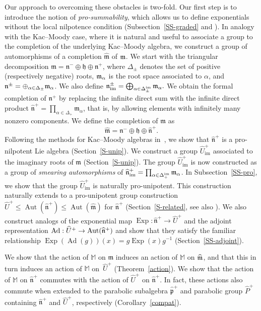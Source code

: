 \documentclass[11pt,letterpaper]{amsart}
\numberwithin{thecounter}{section}
\theoremstyle{definition}
\DeclareMathOperator{\Aut}{Aut}
\DeclareMathOperator{\Exp}{Exp}
\DeclareMathOperator{\Ad}{Ad}
\DeclareMathOperator{\im}{{im}}
\renewcommand{\a}{\alpha}
\newcommand{\M}{{\mathbb M}}
\newcommand{\Uhp}{{\widehat{U}^+}}
\newcommand{\Uhimp}{{\widehat{U}_{\im}^+}}
\newcommand{\nhp}{{\widehat{\mathfrak{n}}^+}}
\newcommand{\nm}{{\mathfrak{n}^-}}
\newcommand{\nhimp}{{\widehat{\mathfrak{n}}_{\im}^+}}
\newcommand{\nimpm}{{\mathfrak{n}_{\im}^\pm}}
\begin{document}
Our approach to overcoming these obstacles is two-fold. Our first step is to 
introduce the notion of \emph{pro-summability}, which allows us to define exponentials without the local nilpotence condition (Subsection~\ref{SS-graded} and \cite{CJM}). In analogy with  the Kac--Moody case, where it is natural and useful to associate a group to the completion of the underlying Kac--Moody algebra, we construct a group of automorphisms of a completion $\widehat{\mathfrak{m}}$ of $\frak m$.   We start with the triangular decomposition 
$\mathfrak{m}=\mathfrak{n}^-\oplus\mathfrak{h}\oplus\mathfrak{n^+}$,
where $\Delta_\pm$ denotes the set of positive (respectively negative) roots, $\frak m_{\alpha}$ is the root space associated to $\a$,
and $\frak n^{\pm}= \oplus_{\alpha\in \Delta_\pm}\frak m_{\alpha}$. We also define $\nimpm = \bigoplus_{\a\in\Delta^{\im}_\pm} \frak m_\a.$
We obtain the formal completion of $\mathfrak{n}^+$ by replacing the infinite direct sum with the infinite direct product 
$\nhp = \prod_{\a\in\Delta_+}\mathfrak{m}_\a$, that is, by allowing elements with infinitely many nonzero components. 
We define the completion of $\mathfrak{m}$ as
$$\widehat{\mathfrak{m}}=\nm\oplus\mathfrak{h}\oplus\nhp.$$
Following the methods for Kac--Moody algebras  in~\cite{kumar2012kac}, we show that $\nhp$ is a pro-nilpotent Lie algebra (Section~\ref{S-unip}).
We construct a group $\Uhimp$ associated to the imaginary roots of $\mathfrak m$  (Section~\ref{S-unip}). 
The group $\Uhimp$  is now constructed as a group of \emph{smearing  automorphisms} of $\nhimp=\prod_{\a\in\Delta^{\im}_+} \frak m_{\a}$. In Subsection~\ref{SS-pro}, we show that the group $\Uhimp$ is naturally  pro-unipotent. 
This construction naturally extends to a pro-unipotent group construction 
$\Uhp \leq \Aut(\widehat{\mathfrak{n}}^+)\leq \Aut(\widehat{\mathfrak{m}})$ for $\widehat{\mathfrak{n}}^+$ (Section~\ref{S-related}, see also \cite{CJM}).
We also construct  analogs of the exponential map 
 $\Exp: \widehat{\mathfrak{n}}^+\to\Uhp$
 and  the adjoint representation
${\Ad} :\Uhp \to \Aut(\widehat{\frak{n}}^+)$ and show that they satisfy the familiar relationship $\Exp\left(\Ad(g)\right)(x)=g\Exp(x) g^{-1}$ (Section~\ref{SS-adjoint}).


We show that the action of $\M$ on $\mathfrak m$ induces an action of $\M$ on $\widehat{\frak m}$, and that this in turn induces an action of $\M$ on~$\Uhp$ (Theorem~\ref{action}). We show that the action of $\M$ on $\widehat{\mathfrak n}^+$ commutes with
the action of  $\widehat{U}^+$ on $\widehat{\mathfrak n}^+$. In fact, these actions also commute when extended to the parabolic subalgebra $\widehat{\mathfrak p}^+$ and parabolic group $\widehat{P}^+$ containing $\widehat{\mathfrak n}^+$ and $\widehat{U}^+$, respectively (Corollary~\ref{compat}).
\end{document}
